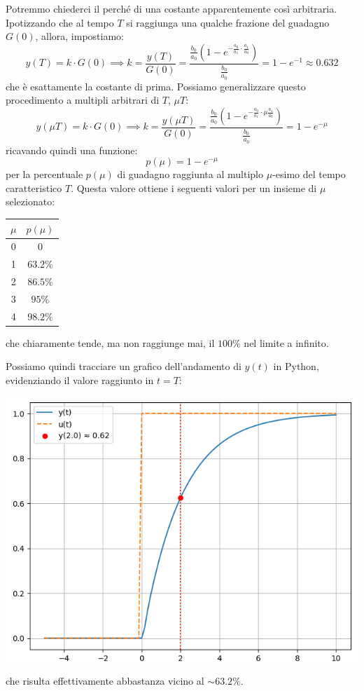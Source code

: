 \documentclass[a4paper,11pt]{article}
\begin{document}
Potremmo chiederci il perché di una costante apparentemente così arbitraria.
Ipotizzando che al tempo $T$ si raggiunga una qualche frazione del guadagno $G(0)$, allora, impostiamo:
$$
y(T) = k \cdot G(0) \implies k = \frac{y(T)}{G(0)} = \frac{\frac{b_0}{a_0} \left( 1 - e^{-\frac{a_0}{a_1} \cdot \frac{a_1}{a_0}} \right) }{\frac{b_0}{a_0}} = 1 - e^{-1} \approx 0.632
$$
che è esattamente la costante di prima.
Possiamo generalizzare questo procedimento a multipli arbitrari di $T$, $\mu T$:
$$
y(\mu T) = k \cdot G(0) \implies k = \frac{y(\mu T)}{G(0)} = \frac{\frac{b_0}{a_0} \left( 1 - e^{-\frac{a_0}{a_1} \cdot \mu \frac{a_1}{a_0}} \right) }{\frac{b_0}{a_0}} = 1 - e^{-\mu} 
$$
ricavando quindi una funzione:
$$
p(\mu) = 1 - e^{-\mu}
$$
per la percentuale $p(\mu)$ di guadagno raggiunta al multiplo $\mu$-esimo del tempo caratteristico $T$. 
Questa valore ottiene i seguenti valori per un insieme di $\mu$ selezionato:
\begin{table}[H]
	\center {}
	\begin{tabular} { c | c }
		$\mu$ & $p(\mu)$ \\
		\hline 
		0 & 0 \\ 
		1 & $63.2 \% $ \\
		2 & $86.5 \% $ \\
		3 & $95 \% $ \\
		4 & $98.2 \% $ \\
	\end{tabular}
\end{table}
che chiaramente tende, ma non raggiunge mai, il $100 \%$ nel limite a infinito.

\noindent
\begin{minipage}{\textwidth}
	Possiamo quindi tracciare un grafico dell'andamento di $y(t)$ in Python, evidenziando il valore raggiunto in $t = T$:
	\begin{center}
		\includegraphics[scale=0.62]{../figures/first_degree_step_response.png}
	\end{center}
	che risulta effettivamente abbastanza vicino al $\sim 63.2 \%$.
\end{minipage}
\end{document}
